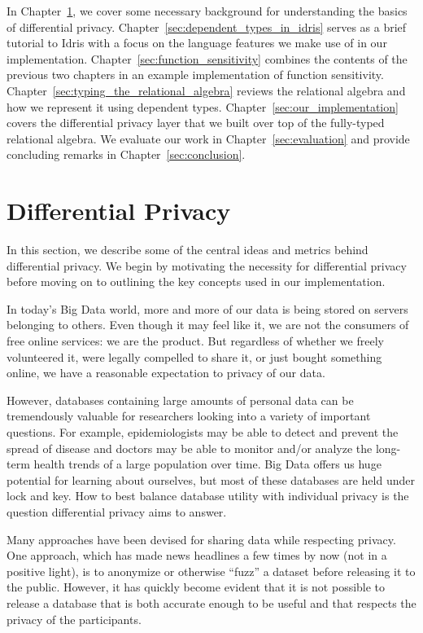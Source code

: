 \documentclass[12pt]{article}
\begin{document}
In Chapter~\ref{sec:differential_privacy}, we cover some necessary background for understanding the basics of differential privacy.
Chapter~\ref{sec:dependent_types_in_idris} serves as a brief tutorial to Idris with a focus on the language features we make use of in our implementation.
Chapter~\ref{sec:function_sensitivity} combines the contents of the previous two chapters in an example implementation of function sensitivity.
Chapter~\ref{sec:typing_the_relational_algebra} reviews the relational algebra and how we represent it using dependent types.
Chapter~\ref{sec:our_implementation} covers the differential privacy layer that we built over top of the fully-typed relational algebra.
We evaluate our work in Chapter~\ref{sec:evaluation} and provide concluding remarks in Chapter~\ref{sec:conclusion}.

\section{Differential Privacy}\label{sec:differential_privacy}

In this section, we describe some of the central ideas and metrics behind differential privacy.
We begin by motivating the necessity for differential privacy before moving on to outlining the key concepts used in our implementation.


In today's Big Data world, more and more of our data is being stored on servers belonging to others.
Even though it may feel like it, we are not the consumers of free online services: we are the product.
But regardless of whether we freely volunteered it, were legally compelled to share it, or just bought something online, we have a reasonable expectation to privacy of our data.

However, databases containing large amounts of personal data can be tremendously valuable for researchers looking into a variety of important questions.
For example, epidemiologists may be able to detect and prevent the spread of disease and doctors may be able to monitor and/or analyze the long-term health trends of a large population over time.
Big Data offers us huge potential for learning about ourselves, but most of these databases are held under lock and key.
How to best balance database utility with individual privacy is the question differential privacy aims to answer.

Many approaches have been devised for sharing data while respecting privacy.
One approach, which has made news headlines a few times by now (not in a positive light), is to anonymize or otherwise ``fuzz'' a dataset before releasing it to the public.
However, it has quickly become evident that it is not possible to release a database that is both accurate enough to be useful and that respects the privacy of the participants\cite{journals/cacm/Dwork11}.
\end{document}
